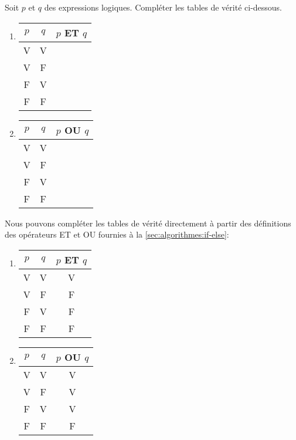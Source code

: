 \begin{exercice}
  Soit $p$ et $q$ des expressions logiques. Compléter les tables de
  vérité ci-dessous.
  \begin{multicols}{2}
    \begin{enumerate}
    \item
      \begin{tabular}{ccc}
        \toprule
        $p$ & $q$ & $p$ ET $q$ \\
        \midrule
        V & V \\
        V & F \\
        F & V \\
        F & F \\
        \bottomrule
      \end{tabular}
      \columnbreak
    \item
      \begin{tabular}{ccc}
        \toprule
        $p$ & $q$ & $p$ OU $q$ \\
        \midrule
        V & V \\
        V & F \\
        F & V \\
        F & F \\
        \bottomrule
      \end{tabular}
    \end{enumerate}
  \end{multicols}
  \begin{sol}
    Nous pouvons compléter les tables de vérité directement à partir
    des définitions des opérateurs ET et OU fournies à la
    \autoref{sec:algorithmes:if-else}:
    \begin{multicols}{2}
      \begin{enumerate}
      \item
        \begin{tabular}{ccc}
          \toprule
          $p$ & $q$ & $p$ ET $q$ \\
          \midrule
          V & V & V \\
          V & F & F \\
          F & V & F \\
          F & F & F \\
          \bottomrule
        \end{tabular}
        \columnbreak
      \item
        \begin{tabular}{ccc}
          \toprule
          $p$ & $q$ & $p$ OU $q$ \\
          \midrule
          V & V & V \\
          V & F & V \\
          F & V & V \\
          F & F & F \\
          \bottomrule
        \end{tabular}
      \end{enumerate}
    \end{multicols}
  \end{sol}
\end{exercice}

